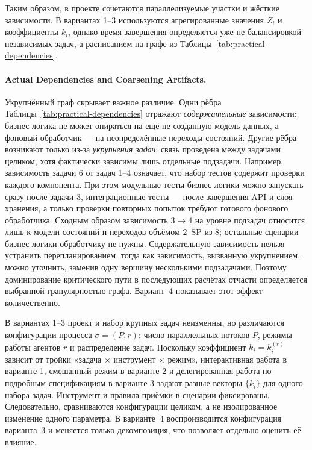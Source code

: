\documentclass[12pt,a4paper]{article}
\theoremstyle{definition}
\begin{document}
Таким образом, в проекте сочетаются параллелизуемые участки и жёсткие зависимости. В вариантах 1--3 используются агрегированные значения $Z_i$ и коэффициенты $k_i$, однако время завершения определяется уже не балансировкой независимых задач, а расписанием на графе из Таблицы~\ref{tab:practical-dependencies}.

\paragraph{Actual Dependencies and Coarsening Artifacts.}
Укрупнённый граф скрывает важное различие. Одни рёбра Таблицы~\ref{tab:practical-dependencies} отражают \emph{содержательные} зависимости: бизнес-логика не может опираться на ещё не созданную модель данных, а фоновый обработчик --- на неопределённые переходы состояний. Другие рёбра возникают только из-за \emph{укрупнения задач}: связь проведена между задачами целиком, хотя фактически зависимы лишь отдельные подзадачи. Например, зависимость задачи 6 от задач 1--4 означает, что набор тестов содержит проверки каждого компонента. При этом модульные тесты бизнес-логики можно запускать сразу после задачи 3, интеграционные тесты --- после завершения API и слоя хранения, а только проверки повторных попыток требуют готового фонового обработчика. Сходным образом зависимость $3 \to 4$ на уровне подзадач относится лишь к модели состояний и переходов объёмом $2$~SP из $8$; остальные сценарии бизнес-логики обработчику не нужны. Содержательную зависимость нельзя устранить перепланированием, тогда как зависимость, вызванную укрупнением, можно уточнить, заменив одну вершину несколькими подзадачами. Поэтому доминирование критического пути в последующих расчётах отчасти определяется выбранной гранулярностью графа. Вариант~4 показывает этот эффект количественно.

В вариантах 1--3 проект и набор крупных задач неизменны, но различаются конфигурации процесса $\sigma = (P, r)$: число параллельных потоков $P$, режимы работы агентов $r$ и распределение задач. Поскольку коэффициент $k_i = k_i^{(r)}$ зависит от тройки «задача $\times$ инструмент $\times$ режим», интерактивная работа в варианте 1, смешанный режим в варианте 2 и делегированная работа по подробным спецификациям в варианте 3 задают разные векторы $\{k_i\}$ для одного набора задач. Инструмент и правила приёмки в сценарии фиксированы. Следовательно, сравниваются конфигурации целиком, а не изолированное изменение одного параметра. В варианте~4 воспроизводится конфигурация варианта~3 и меняется только декомпозиция, что позволяет отдельно оценить её влияние.
\end{document}
